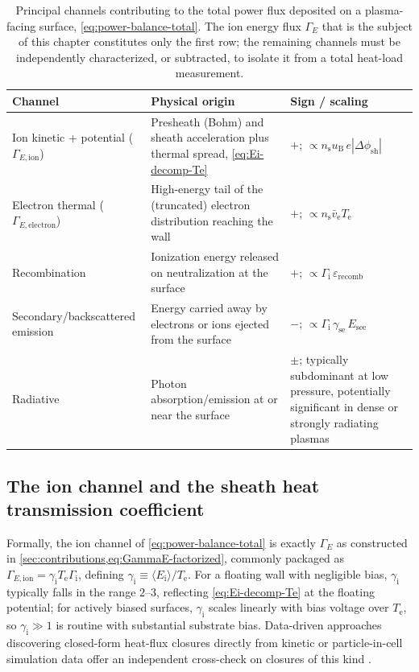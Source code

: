 \begin{table}[htbp]
\centering
\caption{Principal channels contributing to the total power flux deposited on a plasma-facing surface, \cref{eq:power-balance-total}. The ion energy flux $\Gamma_{E}$ that is the subject of this chapter constitutes only the first row; the remaining channels must be independently characterized, or subtracted, to isolate it from a total heat-load measurement.}
\label{tab:power-channels}
\begin{tabular}{@{}p{3.4cm}p{6.0cm}p{4.4cm}@{}}
\toprule
Channel & Physical origin & Sign / scaling \\
\midrule
Ion kinetic + potential ($\Gamma_{E,\mathrm{ion}}$) & Presheath (Bohm) and sheath acceleration plus thermal spread, \cref{eq:Ei-decomp-Te} & $+$; $\propto n_{\mathrm{s}} u_{\mathrm{B}}\, e|\Delta\phi_{\mathrm{sh}}|$ \\
Electron thermal ($\Gamma_{E,\mathrm{electron}}$) & High-energy tail of the (truncated) electron distribution reaching the wall & $+$; $\propto n_{\mathrm{s}} \bar v_{\mathrm{e}} T_{\mathrm{e}}$ \\
Recombination & Ionization energy released on neutralization at the surface & $+$; $\propto \Gamma_{\mathrm{i}}\,\varepsilon_{\mathrm{recomb}}$ \\
Secondary/backscattered emission & Energy carried away by electrons or ions ejected from the surface & $-$; $\propto \Gamma_{\mathrm{i}}\, \gamma_{\mathrm{se}}\, E_{\mathrm{see}}$ \\
Radiative & Photon absorption/emission at or near the surface & $\pm$; typically subdominant at low pressure, potentially significant in dense or strongly radiating plasmas \\
\bottomrule
\end{tabular}
\end{table}

\subsection{The ion channel and the sheath heat transmission coefficient}

Formally, the ion channel of \cref{eq:power-balance-total} is exactly $\Gamma_{E}$ as constructed in \cref{sec:contributions,eq:GammaE-factorized}, commonly packaged as $\Gamma_{E,\mathrm{ion}} = \gamma_{\mathrm{i}} T_{\mathrm{e}} \Gamma_{\mathrm{i}}$, defining $\gamma_{\mathrm{i}} \equiv \langle E_{\mathrm{i}}\rangle / T_{\mathrm{e}}$. For a floating wall with negligible bias, $\gamma_{\mathrm{i}}$ typically falls in the range $2$--$3$, reflecting \cref{eq:Ei-decomp-Te} at the floating potential; for actively biased surfaces, $\gamma_{\mathrm{i}}$ scales linearly with bias voltage over $T_{\mathrm{e}}$, so $\gamma_{\mathrm{i}} \gg 1$ is routine with substantial substrate bias. Data-driven approaches discovering closed-form heat-flux closures directly from kinetic or particle-in-cell simulation data offer an independent cross-check on closures of this kind \cite{ref0101}.

